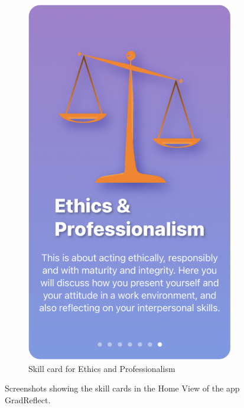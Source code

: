 \documentclass{l4proj}
\begin{document}
\begin{appendices}
\begin{figure}[H]
\begin{subfigure}[b]{0.3\textwidth}
        \includegraphics[scale=0.2]{images/E-ProCard.pdf}
        \caption{Skill card for Ethics and Professionalism}
        \label{fig:E-ProCard}
    \end{subfigure} 
    \caption{Screenshots showing the skill cards in the Home View of the app GradReflect.}
    \label{fig:AllSkillCards}
\end{figure}



%


\end{appendices}
\end{document}
